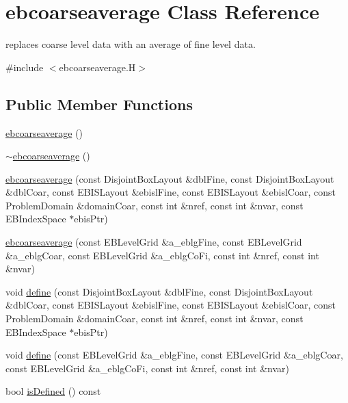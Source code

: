 \hypertarget{classebcoarseaverage}{}\section{ebcoarseaverage Class Reference}
\label{classebcoarseaverage}


replaces coarse level data with an average of fine level data.  




{\ttfamily \#include $<$ebcoarseaverage.\+H$>$}

\subsection*{Public Member Functions}
\begin{DoxyCompactItemize}
\item 
\hyperlink{classebcoarseaverage_a59bde2cf9d859508d9911b46249e2c5f}{ebcoarseaverage} ()
\item 
\hyperlink{classebcoarseaverage_a983b54e242e5921ceea70180e071fcad}{$\sim$ebcoarseaverage} ()
\item 
\hyperlink{classebcoarseaverage_aba950e21b3e35499852ab8354b94cb92}{ebcoarseaverage} (const Disjoint\+Box\+Layout \&dbl\+Fine, const Disjoint\+Box\+Layout \&dbl\+Coar, const E\+B\+I\+S\+Layout \&ebisl\+Fine, const E\+B\+I\+S\+Layout \&ebisl\+Coar, const Problem\+Domain \&domain\+Coar, const int \&nref, const int \&nvar, const E\+B\+Index\+Space $\ast$ebis\+Ptr)
\item 
\hyperlink{classebcoarseaverage_a650af26ba0aabde837e7de3af7515d60}{ebcoarseaverage} (const E\+B\+Level\+Grid \&a\+\_\+eblg\+Fine, const E\+B\+Level\+Grid \&a\+\_\+eblg\+Coar, const E\+B\+Level\+Grid \&a\+\_\+eblg\+Co\+Fi, const int \&nref, const int \&nvar)
\item 
void \hyperlink{classebcoarseaverage_a85160d432dc1caf01226b488dcf003ed}{define} (const Disjoint\+Box\+Layout \&dbl\+Fine, const Disjoint\+Box\+Layout \&dbl\+Coar, const E\+B\+I\+S\+Layout \&ebisl\+Fine, const E\+B\+I\+S\+Layout \&ebisl\+Coar, const Problem\+Domain \&domain\+Coar, const int \&nref, const int \&nvar, const E\+B\+Index\+Space $\ast$ebis\+Ptr)
\item 
void \hyperlink{classebcoarseaverage_a56b505f100cf448c34c5c88683726826}{define} (const E\+B\+Level\+Grid \&a\+\_\+eblg\+Fine, const E\+B\+Level\+Grid \&a\+\_\+eblg\+Coar, const E\+B\+Level\+Grid \&a\+\_\+eblg\+Co\+Fi, const int \&nref, const int \&nvar)
\item 
bool \hyperlink{classebcoarseaverage_aa24e8bc584a2ab09114e3fc6921a4df0}{is\+Defined} () const 

\end{DoxyCompactItemize}
